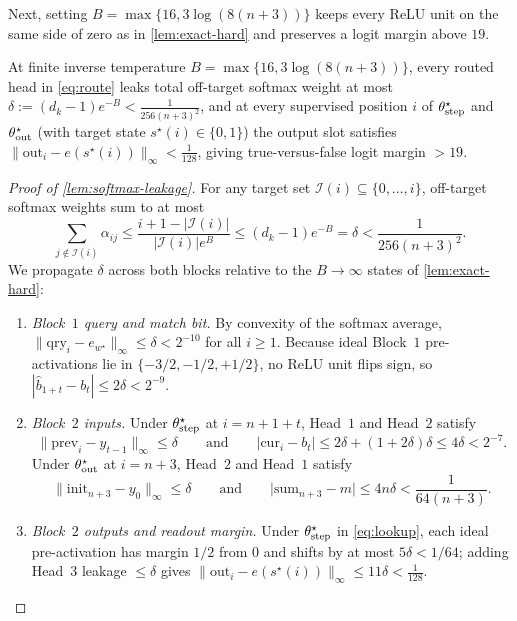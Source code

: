 Next, setting $B = \max\{16, 3\log(8(n+3))\}$ keeps every ReLU unit on the same side of zero as in \cref{lem:exact-hard} and preserves a logit margin above $19$.

\begin{lemma}
\label{lem:softmax-leakage}
At finite inverse temperature $B = \max\{16, 3\log(8(n+3))\}$, every routed head in \cref{eq:route} leaks total off-target softmax weight at most $\delta := (d_k - 1)e^{-B} < \frac{1}{256(n+3)^2}$, and at every supervised position $i$ of $\theta^\star_{\mathrm{step}}$ and $\theta^\star_{\mathrm{out}}$ (with target state $s^\star(i) \in \{0,1\}$) the output slot satisfies $\|\mathrm{out}_i - e(s^\star(i))\|_\infty < \frac{1}{128}$, giving true-versus-false logit margin $> 19$.
\end{lemma}
\begin{proof}[Proof of \cref{lem:softmax-leakage}]
For any target set $\mathcal I(i) \subseteq \{0, \ldots, i\}$, off-target softmax weights sum to at most
\[
 \sum_{j \notin \mathcal I(i)} \alpha_{ij}
 \le \frac{i + 1 - |\mathcal I(i)|}{|\mathcal I(i)|e^{B}}
 \le (d_k - 1)e^{-B} = \delta < \frac{1}{256(n+3)^2}.
\]
We propagate $\delta$ across both blocks relative to the $B \to \infty$ states of \cref{lem:exact-hard}:
\begin{enumerate}[label=(\arabic*),leftmargin=*]
\item \emph{Block~$1$ query and match bit.} By convexity of the softmax average, $\|\mathrm{qry}_i - e_{w^\star}\|_\infty \le \delta < 2^{-10}$ for all $i \ge 1$. Because ideal Block~$1$ pre-activations lie in $\{-3/2, -1/2, +1/2\}$, no ReLU unit flips sign, so $|\hat b_{1+t} - b_t| \le 2\delta < 2^{-9}$.

\item \emph{Block~$2$ inputs.} Under $\theta^\star_{\mathrm{step}}$ at $i = n+1+t$, Head~$1$ and Head~$2$ satisfy
\[
  \bigl\|\mathrm{prev}_i - y_{t-1}\bigr\|_\infty \le \delta
  \qquad\text{and}\qquad
  \bigl|\mathrm{cur}_i - b_t\bigr| \le 2\delta + (1+2\delta)\delta \le 4\delta < 2^{-7}.
\]
Under $\theta^\star_{\mathrm{out}}$ at $i = n+3$, Head~$2$ and Head~$1$ satisfy
\[
  \bigl\|\mathrm{init}_{n+3} - y_0\bigr\|_\infty \le \delta
  \qquad\text{and}\qquad
  \bigl|\mathrm{sum}_{n+3} - m\bigr| \le 4n\delta < \frac{1}{64(n+3)}.
\]

\item \emph{Block~$2$ outputs and readout margin.} Under $\theta^\star_{\mathrm{step}}$ in \cref{eq:lookup}, each ideal pre-activation has margin $1/2$ from $0$ and shifts by at most $5\delta < 1/64$; adding Head~$3$ leakage $\le \delta$ gives $\|\mathrm{out}_i - e(s^\star(i))\|_\infty \le 11\delta < \frac{1}{128}$.


\end{enumerate}
\end{proof}
